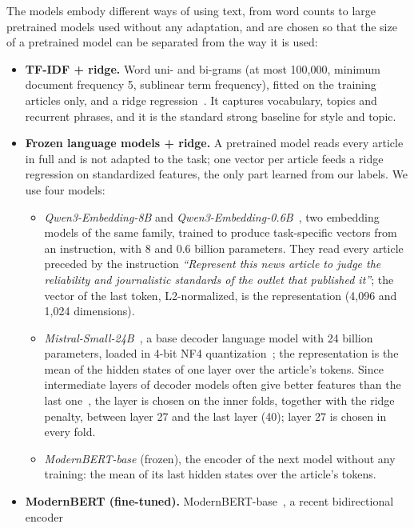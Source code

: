 \documentclass[11pt,a4paper]{article}
\begin{document}
The models embody different ways of using text, from word counts to large pretrained models used without any
adaptation, and are chosen so that the size of a pretrained model can be separated from the way it is used:
\begin{itemize}
  \item \textbf{TF-IDF + ridge.} Word uni- and bi-grams (at most 100,000, minimum document frequency 5, sublinear term
        frequency), fitted on the training articles only, and a ridge regression~\cite{hoerl1970ridge}. It captures
        vocabulary, topics and recurrent phrases, and it is the standard strong baseline for style and topic.
  \item \textbf{Frozen language models + ridge.} A pretrained model reads every article in full and is not adapted to
        the task; one vector per article feeds a ridge regression on standardized features, the only part learned from
        our labels. We use four models:
        \begin{itemize}
          \item \emph{Qwen3-Embedding-8B} and \emph{Qwen3-Embedding-0.6B}~\cite{zhang2025qwen3}, two embedding models of
                the same family, trained to produce task-specific vectors from an instruction, with 8 and 0.6 billion
                parameters. They read every article preceded by the instruction \emph{``Represent this news article to
                judge the reliability and journalistic standards of the outlet that published it''}; the vector of the
                last token, L2-normalized, is the representation (4,096 and 1,024 dimensions).
          \item \emph{Mistral-Small-24B}~\cite{mistralsmall}, a base decoder language model with 24 billion parameters,
                loaded in 4-bit NF4 quantization~\cite{dettmers2023qlora}; the representation is the mean of the hidden
                states of one layer over the article's tokens. Since intermediate layers of decoder models often give
                better features than the last one~\cite{skean2025layer}, the layer is chosen on the inner folds,
                together with the ridge penalty, between layer 27 and the last layer (40); layer 27 is chosen in every
                fold.
          \item \emph{ModernBERT-base} (frozen), the encoder of the next model without any training: the mean of its last
                hidden states over the article's tokens.
        \end{itemize}
  \item \textbf{ModernBERT (fine-tuned).} ModernBERT-base~\cite{warner2024modernbert}, a recent bidirectional encoder

\end{itemize}
\end{document}
